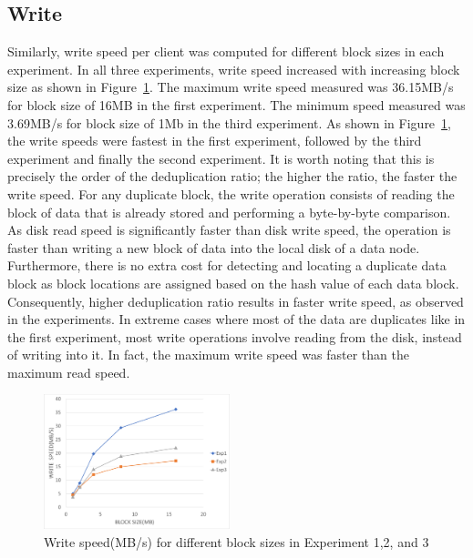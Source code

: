 \documentclass[11pt,twocolumn]{article}
\begin{document}
\subsection{Write}\label{results:write}
Similarly, write speed per client was computed for different block sizes in each experiment. In all three experiments, write speed increased with increasing block size as shown in Figure~\ref{write_speed}. The maximum write speed measured was 36.15MB/s for block size of 16MB in the first experiment. The minimum speed measured was 3.69MB/s for block size of 1Mb in the third experiment. As shown in Figure~\ref{write_speed}, the write speeds were fastest in the first experiment, followed by the third experiment and finally the second experiment. It is worth noting that this is precisely the order of the deduplication ratio; the higher the ratio, the faster the write speed. For any duplicate block, the write operation consists of reading the block of data that is already stored and performing a byte-by-byte comparison. As disk read speed is significantly faster than disk write speed, the operation is faster than writing a new block of data into the local disk of a data node. Furthermore, there is no extra cost for detecting and locating a duplicate data block as block locations are assigned based on the hash value of each data block. Consequently, higher deduplication ratio results in faster write speed, as observed in the experiments. In extreme cases where most of the data are duplicates like in the first experiment, most write operations involve reading from the disk, instead of writing into it. In fact, the maximum write speed was faster than the maximum read speed.

\begin{figure}[H]
  \center
  \includegraphics[width=0.48\textwidth]{write_speed.png}
  \caption{{\label{write_speed} }Write speed(MB/s) for different block sizes in Experiment 1,2, and 3 }
\end{figure}
\end{document}
